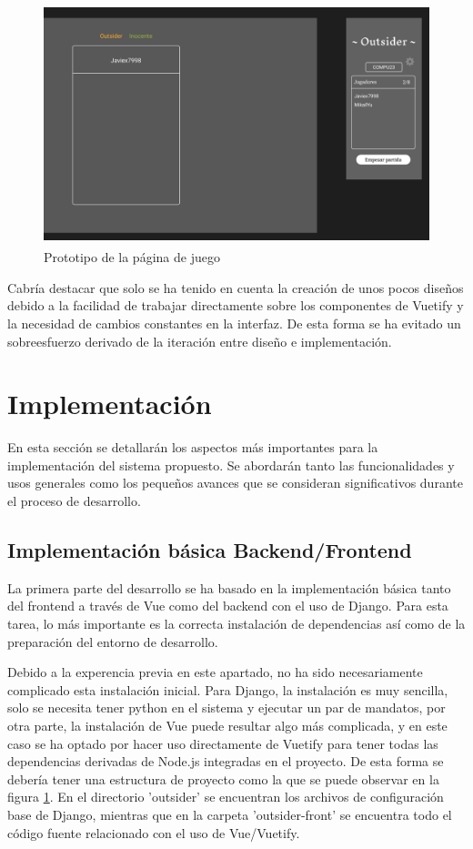 \begin{figure}[h]
	\centering
	\includegraphics[height=7cm]{res_designJuego.png}
	\caption{Prototipo de la página de juego}
	\label{fig:res_designJuego}
\end{figure}

Cabría destacar que solo se ha tenido en cuenta la creación de unos pocos diseños debido a la facilidad de trabajar directamente
sobre los componentes de Vuetify y la necesidad de cambios constantes en la interfaz. De esta forma se ha evitado un 
sobreesfuerzo derivado de la iteración entre diseño e implementación.

\section{Implementación}

En esta sección se detallarán los aspectos más importantes para la implementación del sistema propuesto. 
Se abordarán tanto las funcionalidades y usos generales como los pequeños avances que se consideran significativos 
durante el proceso de desarrollo.

\subsection{Implementación básica Backend/Frontend}

La primera parte del desarrollo se ha basado en la implementación básica tanto del frontend a través de Vue como del 
backend con el uso de Django. Para esta tarea, lo más importante es la correcta instalación de dependencias así como de
la preparación del entorno de desarrollo.

Debido a la experencia previa en este apartado, no ha sido necesariamente complicado esta instalación inicial. Para Django,
la instalación es muy sencilla, solo se necesita tener python en el sistema y ejecutar un par de mandatos, por otra parte,
la instalación de Vue puede resultar algo más complicada, y en este caso se ha optado por hacer uso directamente de Vuetify para
tener todas las dependencias derivadas de Node.js integradas en el proyecto. De esta forma se debería tener una estructura de proyecto
como la que se puede observar en la figura \ref{fig:res_designJuego}. En el directorio 'outsider' se encuentran los archivos 
de configuración base de Django, mientras que en la carpeta 'outsider-front' se encuentra todo el código fuente relacionado 
con el uso de Vue/Vuetify. 

